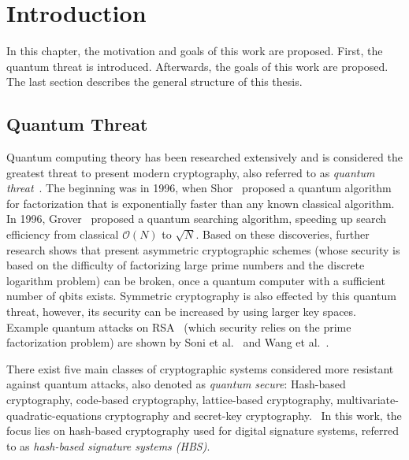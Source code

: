 \chapter{Introduction}
\label{cha:introduction}
In this chapter, the motivation and goals of this work are proposed. First, the quantum threat is introduced. Afterwards, the goals of this work are proposed. The last section describes the general structure of this thesis.

\section{Quantum Threat} %
Quantum computing theory has been researched extensively and is considered the greatest threat to present modern cryptography, also referred to as \textit{quantum threat}~\cite{impact_quantum_crypto_2018}.
The beginning was in 1996, when Shor~\cite{shors_algo_original_1999} proposed a quantum algorithm for factorization that is exponentially faster than any known classical algorithm. In 1996, Grover~\cite{grovers_algo_basispaper_1997} proposed a quantum searching algorithm, speeding up search efficiency from classical $\mathcal{O}(N)$ to $\sqrt{N}$. 
Based on these discoveries, further research shows that present asymmetric cryptographic schemes (whose security is based on the difficulty of factorizing large prime numbers and the discrete logarithm problem) can be broken, once a quantum computer with a sufficient number of qbits exists. 
Symmetric cryptography is also effected by this quantum threat, however, its security can be increased by using larger key spaces.~\cite{impact_quantum_crypto_2018} %
Example quantum attacks on RSA~\cite{rsa_patent} (which security relies on the prime factorization problem) are shown by Soni et al.~\cite{RSA_pq-attack_examples_2018} and Wang et al.~\cite{RSA_pq-attack_without_factorization_2018}.

There exist five main classes of cryptographic systems considered more resistant against quantum attacks, also denoted as \textit{quantum secure}: Hash-based cryptography, code-based cryptography, lattice-based cryptography, multivariate-quadratic-equations cryptography and secret-key cryptography.~\cite{book_pqc_bernstein_2004}
In this work, the focus lies on hash-based cryptography used for digital signature systems, referred to as \textit{hash-based signature systems (HBS)}.

